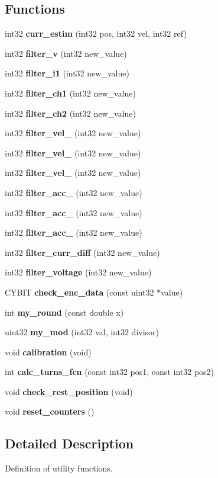 \subsection*{Functions}
\begin{DoxyCompactItemize}
\item 
int32 \textbf{ curr\+\_\+estim} (int32 pos, int32 vel, int32 ref)
\item 
int32 \textbf{ filter\+\_\+v} (int32 new\+\_\+value)
\item 
int32 \textbf{ filter\+\_\+i1} (int32 new\+\_\+value)
\item 
int32 \textbf{ filter\+\_\+ch1} (int32 new\+\_\+value)
\item 
int32 \textbf{ filter\+\_\+ch2} (int32 new\+\_\+value)
\item 
int32 \textbf{ filter\+\_\+vel\+\_} (int32 new\+\_\+value)
\item 
int32 \textbf{ filter\+\_\+vel\+\_} (int32 new\+\_\+value)
\item 
int32 \textbf{ filter\+\_\+vel\+\_} (int32 new\+\_\+value)
\item 
int32 \textbf{ filter\+\_\+acc\+\_} (int32 new\+\_\+value)
\item 
int32 \textbf{ filter\+\_\+acc\+\_} (int32 new\+\_\+value)
\item 
int32 \textbf{ filter\+\_\+acc\+\_} (int32 new\+\_\+value)
\item 
int32 \textbf{ filter\+\_\+curr\+\_\+diff} (int32 new\+\_\+value)
\item 
int32 \textbf{ filter\+\_\+voltage} (int32 new\+\_\+value)
\item 
C\+Y\+B\+IT \textbf{ check\+\_\+enc\+\_\+data} (const uint32 $\ast$value)
\item 
int \textbf{ my\+\_\+round} (const double x)
\item 
uint32 \textbf{ my\+\_\+mod} (int32 val, int32 divisor)
\item 
void \textbf{ calibration} (void)
\item 
int \textbf{ calc\+\_\+turns\+\_\+fcn} (const int32 pos1, const int32 pos2)
\item 
void \textbf{ check\+\_\+rest\+\_\+position} (void)
\item 
void \textbf{ reset\+\_\+counters} ()
\end{DoxyCompactItemize}


\subsection{Detailed Description}
Definition of utility functions. 

